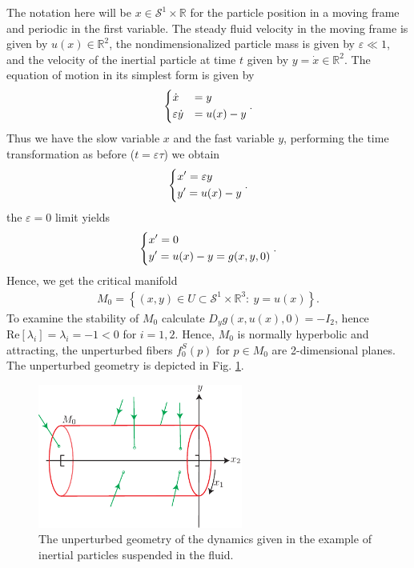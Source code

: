 \begin{ex}
The notation here will be $x\in \mathcal{S}^{1}\times \mathbb{R}$ for the particle position in a moving frame and periodic in the first variable. The steady fluid velocity in the moving frame is given by $u(x) \in \mathbb{R}^{2}$, the nondimensionalized particle mass is given by $\varepsilon \ll 1$, and the velocity of the inertial particle at time $t$ given by $y=\dot{x}\in \mathbb{R}^{2}$. The equation of motion in its simplest form is given by \cite{Maxey1983}
\begin{align}
	\begin{dcases}
		\dot{x} &=y\\
		\varepsilon \dot{y} & = u(x) - y
	\end{dcases}
	.
\end{align}
Thus we have the slow variable $x$ and the fast variable $y$, performing the time transformation as before ($t = \varepsilon \tau$) we obtain
\begin{align}
\begin{dcases}
	x' = \varepsilon y \\
	y' = u(x) - y
\end{dcases}
.	
\end{align}
the $\varepsilon=0$ limit yields
\begin{align}
	\begin{dcases}
		x' = 0 \\
		y' = u(x) - y = g(x,y,0)
	\end{dcases}
	.
\end{align}
Hence, we get the critical manifold
\begin{align}
	M_0 = \left\{ (x,y)\in U \subset \mathcal{S}^{1}\times \mathbb{R}^{3}:\ y = u(x)\right\}.
\end{align}
To examine the stability of $M_0$ calculate $D_{y}g(x, u(x), 0) = - I_{2}$, hence $ \textrm{Re} [\lambda_i]= \lambda_i =-1<0$ for $i=1,2$. Hence, $M_0$ is normally hyperbolic and attracting, the unperturbed fibers $f_{0}^{S}(p)$ for $p\in M_0$ are 2-dimensional planes. The unperturbed geometry is depicted in Fig. \ref{fig:unperturbed_fluid_geometry}.
\begin{figure}[h!]
	\centering
	\includegraphics[width=0.6\textwidth]{figures/ch9/21unperturbed_fluid_geometry.pdf}
	\caption{The unperturbed geometry of the dynamics given in the example of inertial particles suspended in the fluid.}
	\label{fig:unperturbed_fluid_geometry}
\end{figure}


\end{ex}

